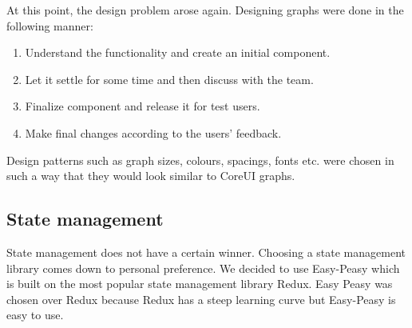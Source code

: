 At this point, the design problem arose again.
Designing graphs were done in the following manner:
\begin{enumerate}
    \item Understand the functionality and create an initial component.
    \item Let it settle for some time and then discuss with the team.
    \item Finalize component and release it for test users.
    \item Make final changes according to the users' feedback.
\end{enumerate}
Design patterns such as graph sizes, colours, spacings, fonts etc. were chosen in such a way that they would look similar to CoreUI graphs.

\subsection{State management}\label{subsec:state-management}
State management does not have a certain winner.
Choosing a state management library comes down to personal preference.
We decided to use Easy-Peasy which is built on the most popular state management library Redux.
Easy Peasy was chosen over Redux because Redux has a steep learning curve but Easy-Peasy is easy to use.
